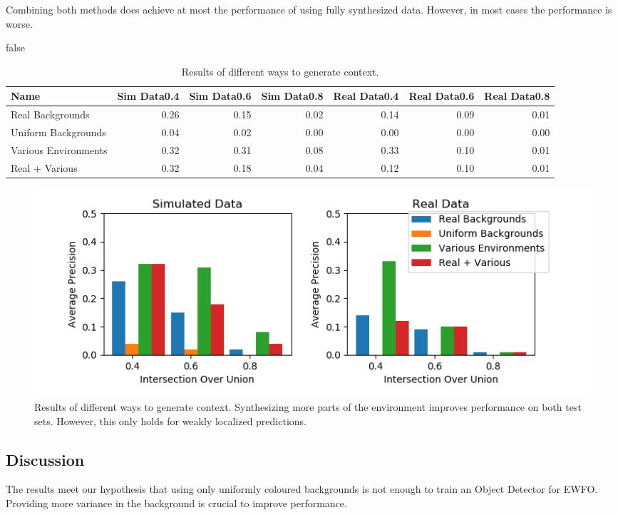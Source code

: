 Combining both methods does achieve at most the performance of using fully synthesized data. However, in most cases the performance is worse.   

\if false
\begin{table}[htbp]
	\caption{Results of different ways to generate context.}
\begin{tabular}{lrrrrrr}
	\hline
	Name &  Sim Data0.4 &  Sim Data0.6 &  Sim Data0.8 &  Real Data0.4 &  Real Data0.6 &  Real Data0.8 \\
	\hline
      Real Backgrounds &         0.26 &         0.15 &         0.02 &          0.14 &          0.09 &          0.01 \\
  Uniform Backgrounds &         0.04 &         0.02 &         0.00 &          0.00 &          0.00 &          0.00 \\
  Various Environments &         0.32 &         0.31 &         0.08 &          0.33 &          0.10 &          0.01 \\
        Real + Various &         0.32 &         0.18 &         0.04 &          0.12 &          0.10 &          0.01 \\
\hline
\end{tabular}
	\label{tab:context}
\end{table}
\fi
\begin{figure}[htbp]
	\includegraphics[width=\textwidth]{fig/context_bar}
	\caption{Results of different ways to generate context. Synthesizing more parts of the environment improves performance on both test sets. However, this only holds for weakly localized predictions.}
	\label{fig:context}
\end{figure}

\subsection{Discussion}

The results meet our hypothesis that using only uniformly coloured backgrounds is not enough to train an Object Detector for \ac{EWFO}. Providing more variance in the background is crucial to improve performance.

